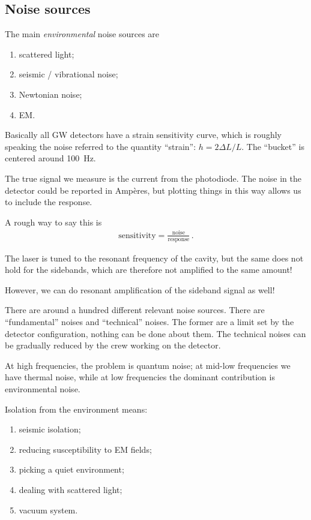 \documentclass[main.tex]{subfiles}
\begin{document}
\subsection{Noise sources}

The main \emph{environmental} noise sources are
\begin{enumerate}
    \item scattered light;
    \item seismic / vibrational noise;
    \item Newtonian noise;
    \item EM.
\end{enumerate}

Basically all GW detectors have a strain sensitivity curve, which is roughly 
speaking the noise referred to the quantity ``strain'': \(h = 2 \Delta L / L\). 
The ``bucket'' is centered around \SI{100}{Hz}.

The true signal we measure is the current from the photodiode. 
The noise in the detector could be reported in Ampères, but plotting 
things in this way allows us to include the response. 

A rough way to say this is 
%
\begin{align}
\text{sensitivity} = \frac{\text{noise}}{\text{response}}
\,.
\end{align}

The laser is tuned to the resonant frequency of the cavity, 
but the same does not hold for the sidebands, which are therefore not 
amplified to the same amount!

However, we can do resonant amplification of the sideband signal as well! 

There are around a hundred different relevant noise sources. 
There are ``fundamental'' noises and ``technical'' noises.
The former are a limit set by the detector configuration, nothing can be done about them. 
The technical noises can be gradually reduced by the crew working on the detector.

At high frequencies, the problem is quantum noise; 
at mid-low frequencies we have thermal noise, 
while at low frequencies the dominant contribution is environmental noise. 

Isolation from the environment means: 
\begin{enumerate}
    \item seismic isolation;
    \item reducing susceptibility to EM fields;
    \item picking a quiet environment;
    \item dealing with scattered light;
    \item vacuum system.
\end{enumerate}
\end{document}
